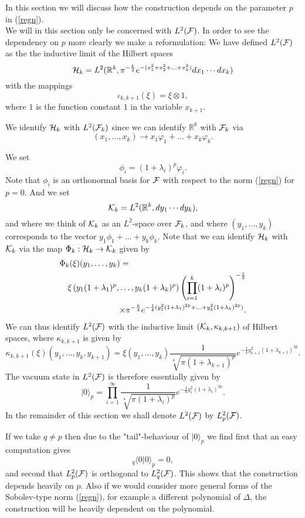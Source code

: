 \documentclass[letterpaper,12pt]{article}
\def\cf{{\cal F}}
\def\ch{{\cal H}}
\def\ck{{\cal K}}
\newcommand{\cF}{{\cal F}}
\newcommand{\R}{\mathbb{ R}}
\begin{document}
In this section we will discuss how the construction depends on the parameter $p$ in (\ref{regn}). \\

We will in this section only be concerned with $L^2(\cf )$. In order to see the dependency on $p$ more clearly we make a reformulation: We have defined  $L^2(\cf )$ as the the inductive limit of the Hilbert spaces 
$$ \ch_k=L^2 (\mathbb{R}^k , \pi^{-\frac{k}{2}}e^{-(x_1^2+x_2^2+\ldots +x_k^2)}dx_1\cdots dx_k)$$
with the mappings 
$$ \iota_{k,k+1} (\xi)=\xi \otimes 1,$$
where $1$ is the function constant $1$ in the variable $x_{k+1}$. 

We identify $\ch_k$ with $L^2 (\cf_k)$ since we can identify $\mathbb{R}^k$ with $\cf_k$ via
$$(x_1,\ldots , x_k)\to  x_1\varphi_1+\ldots + x_k\varphi_k .$$

We set 
$$\phi_i =(1+\lambda_i)^p \varphi_i .$$
Note that  $\phi_i$ is an orthonormal basis for $\cf$   with respect to the norm (\ref{regn}) for $p=0$. And we set 
$$\ck_k=L^2 (\R^k, dy_1 \cdots dy_k)  ,$$
and where we think of $\ck_k$ as an $L^2$-space over $\cf_k$, and where $(y_1,\ldots , y_k)$ corresponds to the vector $y_1\phi_1+\ldots +y_k\phi_k$. Note that we can identify $\ch_k$ with $\ck_k $ via the map $\Phi_k:\ch_k \to \ck_k$ given by
\begin{eqnarray*}
\lefteqn{\Phi_k (\xi) (y_1, \ldots , y_k)=}\\
&& \xi \left(  y_1 (1+\lambda_1)^p, \ldots , y_k (1+\lambda_k)^p \right) \left(\prod_{i=1}^k(1+\lambda_i)^p \right)^{-\frac12}
\\&&\hspace{2,2cm}\times 
\pi^{-\frac{k}{4}}e^{-\frac14 (y_1 ^2(1+\lambda_1)^{2p}+ \ldots + y_k^2 (1+\lambda_k)^{2p})} .
\end{eqnarray*}
We can thus identify $L^2(\cF)$ with the inductive limit $(\ck_k,\kappa_{k,k+1} )$ of Hilbert spaces, where  $\kappa_{k,k+1}$ is given by 
$$\kappa_{k,k+1} (\xi)(y_1,\ldots , y_k,y_{k+1})=\xi(y_1,\ldots , y_k) \frac{1}{\sqrt[4]{\pi (1+\lambda_{k+1})^p}}e^{-\frac14 y_{k+1}^2(1+\lambda_{k+1})^{2p}} .$$
The vacuum state in $L^2(\cf)$ is therefore essentially   given by 
$$|0\rangle_p = \prod_{i=1}^\infty\frac{1}{\sqrt[4]{\pi (1+\lambda_{i})^p}}e^{-\frac14 y_{i}^2(1+\lambda_{i})^{2p}} .$$
In the remainder of this section we shall denote $L^2 (\cf)$ by $L^2_p (\cf)$.

If we take $q\not= p$ then due to the "tail"-behaviour of  $|0\rangle_p$ we find first that an easy computation gives   
$$_q\langle 0 |0\rangle_p =0,$$
and second that $L^2_p(\cf )$ is orthogonal to $L^2_q(\cf )$. 
This shows that the construction depends heavily on $p$. Also if we would consider more general forms of the Sobolev-type norm (\ref{regn}), for example a different polynomial of $\Delta$, the construction will be heavily dependent on the polynomial. 
\end{document}
